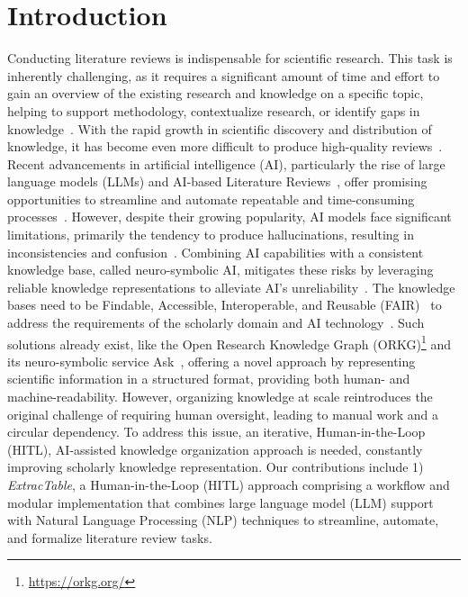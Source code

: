 \documentclass[runningheads]{llncs}
\begin{document}
\section{Introduction}
Conducting literature reviews is indispensable for scientific research.
This task is inherently challenging, as it requires a significant amount of time and effort to gain an overview of the existing research and knowledge on a specific topic, helping to support methodology, contextualize research, or identify gaps in knowledge~\cite{snyder_literature_2019}.
With the rapid growth in scientific discovery and distribution of knowledge, it has become even more difficult to produce high-quality reviews~\cite{larsen_understanding_2019}.
Recent advancements in artificial intelligence (AI), particularly the rise of large language models (LLMs) and AI-based Literature Reviews~\cite{wagner_artificial_2022}, offer promising opportunities to streamline and automate repeatable and time-consuming processes~\cite{rathi_p21_2023}.
However, despite their growing popularity, AI models face significant limitations, primarily the tendency to produce hallucinations, resulting in inconsistencies and confusion~\cite{perkovic_hallucinations_2024}.
Combining AI capabilities with a consistent knowledge base, called neuro-symbolic AI, mitigates these risks by leveraging reliable knowledge representations to alleviate AI's unreliability~\cite{Auer.2025}.
The knowledge bases need to be Findable, Accessible, Interoperable, and Reusable (FAIR)~\cite{wilkinson_fair_2016} to address the requirements of the scholarly domain and AI technology~\cite{Auer.2023}.
Such solutions already exist, like the Open Research Knowledge Graph (ORKG)\footnote{\url{https://orkg.org/}} and its neuro-symbolic service Ask~\cite{Auer.2025}, offering a novel approach by representing scientific information in a structured format, providing both human- and machine-readability.
However, organizing knowledge at scale reintroduces the original challenge of requiring human oversight, leading to manual work and a circular dependency.
To address this issue, an iterative, Human-in-the-Loop (HITL), AI-assisted knowledge organization approach is needed, constantly improving scholarly knowledge representation.
Our contributions include
1) \textit{ExtracTable}, a Human-in-the-Loop (HITL) approach comprising a workflow and modular implementation that combines large language model (LLM) support with Natural Language Processing (NLP) techniques to streamline, automate, and formalize literature review tasks.
\end{document}
